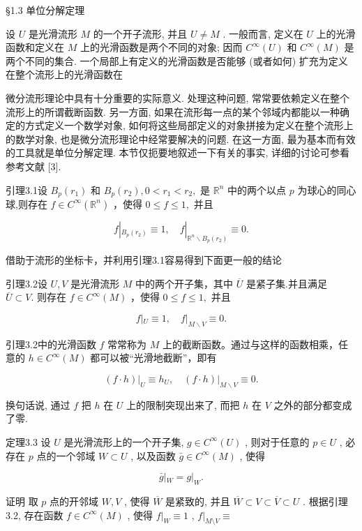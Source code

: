  §1.3 单位分解定理

设  $U$  是光滑流形  $M$  的一个开子流形, 并且  $U \neq M$ . 一般而言, 定义在  $U$  上的光滑函数和定义在  $M$  上的光滑函数是两个不同的对象; 因而  $C^\infty(U)$  和  $C^\infty(M)$  是两个不同的集合. 一个局部上有定义的光滑函数是否能够 (或者如何) 扩充为定义在整个流形上的光滑函数在

微分流形理论中具有十分重要的实际意义. 处理这种问题, 常常要依赖定义在整个流形上的所谓截断函数. 另一方面, 如果在流形每一点的某个邻域内都能以一种确定的方式定义一个数学对象, 如何将这些局部定义的对象拼接为定义在整个流形上的数学对象, 也是微分流形理论中经常要解决的问题. 在这一方面, 最为基本而有效的工具就是单位分解定理. 本节仅扼要地叙述一下有关的事实, 详细的讨论可参看参考文献 [3].

引理3.1设  $B_{p}(r_{1})$  和  $B_{p}(r_{2}),0 < r_{1} < r_{2},$  是  $\mathbb{R}^n$  中的两个以点 $p$  为球心的同心球,则存在  $f\in C^{\infty}(\mathbb{R}^{n})$  ，使得  $0\leqslant f\leqslant 1,$  并且

$$
f | _ {B _ {p} (r _ {2})} \equiv 1, \quad f | _ {\mathbb {R} ^ {n} \backslash B _ {p} (r _ {2})} \equiv 0.
$$

借助于流形的坐标卡，并利用引理3.1容易得到下面更一般的结论

引理3.2设  $U,V$  是光滑流形  $M$  中的两个开子集，其中  $\overline{U}$  是紧子集.并且满足  $\overline{U}\subset V.$  则存在  $f\in C^{\infty}(M)$  ，使得  $0\leqslant f\leqslant 1,$  并且

$$
f | _ {U} \equiv 1, \quad f | _ {M \backslash V} \equiv 0.
$$

引理3.2中的光滑函数  $f$  常常称为  $M$  上的截断函数。通过与这样的函数相乘，任意的  $h \in C^{\infty}(M)$  都可以被“光滑地截断”，即有

$$
\left. (f \cdot h) \right| _ {U} \equiv h _ {U}, \quad \left. (f \cdot h) \right| _ {M \backslash V} \equiv 0.
$$

换句话说, 通过  $f$  把  $h$  在  $U$  上的限制突现出来了, 而把  $h$  在  $V$  之外的部分都变成了零.

定理3.3 设  $U$  是光滑流形上的一个开子集,  $g \in C^{\infty}(U)$ , 则对于任意的  $p \in U$ , 必存在  $p$  点的一个邻域  $W \subset U$ , 以及函数  $\bar{g} \in C^{\infty}(M)$ , 使得

$$
\bar {g} | _ {W} = g | _ {W}.
$$

证明 取  $p$  点的开邻域  $W, V$ , 使得  $\overline{W}$  是紧致的, 并且  $\overline{W} \subset V \subset \overline{V} \subset U$ . 根据引理3.2, 存在函数  $f \in C^{\infty}(M)$ , 使得  $f|_{W} \equiv 1$ ,  $f|_{M \setminus V} \equiv$

